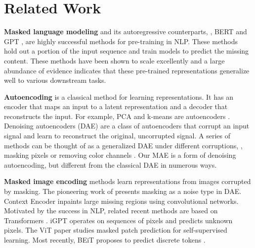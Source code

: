 \documentclass[10pt,twocolumn,letterpaper]{article}
\renewcommand{\paragraph}[1]{\vspace{1.25mm}\noindent\textbf{#1}}
\begin{document}
\section{Related Work}\label{sec:related}

\paragraph{Masked language modeling} and its autoregressive counterparts, \eg, BERT \cite{Devlin2019} and GPT \cite{Radford2018, Radford2019, Brown2020}, are highly successful methods for pre-training in NLP. These methods hold out a portion of the input sequence and train models to predict the missing content. These methods have been shown to scale excellently \cite{Brown2020} and a large abundance of evidence indicates that these pre-trained representations generalize well to various downstream tasks.

\paragraph{Autoencoding} is a classical method for learning representations. It has an encoder that maps an input to a latent representation and a decoder that reconstructs the input. For example, PCA and k-means are autoencoders \cite{Hinton1994}. Denoising autoencoders (DAE) \cite{Vincent2008} are a class of autoencoders that corrupt an input signal and learn to reconstruct the original, uncorrupted signal. A series of methods can be thought of as a generalized DAE under different corruptions, \eg, masking pixels \cite{Vincent2010, Pathak2016, Chen2020c} or removing color channels \cite{Zhang2016}. Our MAE is a form of denoising autoencoding, but different from the classical DAE in numerous ways.

\paragraph{Masked image encoding} methods learn representations from images corrupted by masking. The pioneering work of \cite{Vincent2010} presents masking as a noise type in DAE. Context Encoder \cite{Pathak2016} inpaints large missing regions using convolutional networks. Motivated by the success in NLP, related recent methods \cite{Chen2020c, Dosovitskiy2021, Bao2021} are based on Transformers \cite{Vaswani2017}. iGPT \cite{Chen2020c} operates on sequences of pixels and predicts unknown pixels. The ViT paper \cite{Dosovitskiy2021} studies masked patch prediction for self-supervised learning. Most recently, BEiT \cite{Bao2021} proposes to predict discrete tokens \cite{Oord2017, Ramesh2021}.
\end{document}
